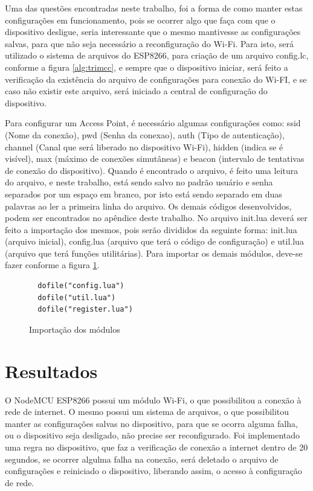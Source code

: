 \documentclass[journal]{IEEEtran}
\begin{document}
Uma das questões encontradas neste trabalho, foi a forma de como manter estas configurações em funcionamento, pois se ocorrer algo que faça com que o dispositivo desligue, seria interessante que o mesmo mantivesse as configurações salvas, para que não seja necessário a reconfiguração do Wi-Fi. Para isto, será utilizado o sistema de arquivos do ESP8266, para criação de um arquivo config.lc, conforme a figura \ref{alg:trimcc}, e sempre que o dispositivo iniciar, será feito a verificação da existência do arquivo de configurações para conexão do Wi-FI, e se caso não existir este arquivo, será iniciado a central de configuração do dispositivo.

Para configurar um Access Point, é necessário algumas configurações como: ssid (Nome da conexão), pwd (Senha da conexao), auth (Tipo de autenticação), channel (Canal que será liberado no dispositivo Wi-Fi), hidden (indica se é visível), max (máximo de conexões simutâneas) e beacon (intervalo de tentativas de conexão do dispositivo). Quando é encontrado o arquivo, é feito uma leitura do arquivo, e neste trabalho, está sendo salvo no padrão usuário e senha separados por um espaço em branco, por isto está sendo separado em duas palavras ao ler a primeira linha do arquivo. Os demais códigos desenvolvidos, podem ser encontrados no apêndice deste trabalho. No arquivo init.lua deverá ser feito a importação dos mesmos, pois serão divididos da seguinte forma: init.lua (arquivo inicial), config.lua (arquivo que terá o código de configuração) e util.lua (arquivo que terá funções utilitárias). Para importar os demais módulos, deve-se fazer conforme a figura \ref{alg:importsdofile}.
\begin{figure}[H]
\begin{lstlisting} 
  dofile("config.lua")
  dofile("util.lua")
  dofile("register.lua")
\end{lstlisting}

\caption{Importação dos módulos}
\label{alg:importsdofile}
\end{figure}


\section{Resultados}
O NodeMCU ESP8266 possui um módulo Wi-Fi, o que possibilitou a conexão à rede de internet. O mesmo possui um sistema de arquivos, o que possibilitou manter as configurações salvas no dispositivo, para que se ocorra alguma falha, ou o dispositivo seja desligado, não precise ser reconfigurado. Foi implementado uma regra no dispositivo, que faz a verificação de conexão a internet dentro de 20 segundos, se ocorrer algulma falha na conexão, será deletado o arquivo de configurações e reiniciado o dispositivo, liberando assim, o acesso à configuração de rede.
\end{document}
